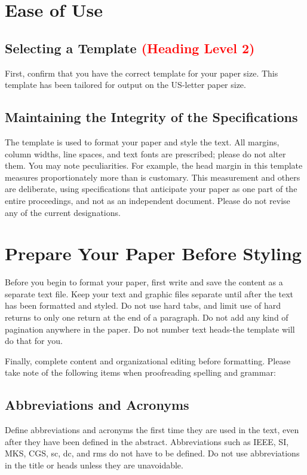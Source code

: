 \documentclass[conference]{IEEEconf}
\begin{document}
\section{Ease of Use}

\subsection{Selecting a Template \textcolor{red}{(Heading Level 2)}}
First, confirm that you have the correct template for your paper size. This template has been tailored for output on the US-letter paper size.

\subsection{Maintaining the Integrity of the Specifications}
The template is used to format your paper and style the text. All margins, column widths, line spaces, and text fonts are prescribed; please do not alter them. You may note peculiarities. For example, the head margin in this template measures proportionately more than is customary. This measurement and others are deliberate, using specifications that anticipate your paper as one part of the entire proceedings, and not as an independent document. Please do not revise any of the current designations.

\section{Prepare Your Paper Before Styling}
Before you begin to format your paper, first write and save the content as a separate text file. Keep your text and graphic files separate until after the text has been formatted and styled. Do not use hard tabs, and limit use of hard returns to only one return at the end of a paragraph. Do not add any kind of pagination anywhere in the paper. Do not number text heads-the template will do that for you.

Finally, complete content and organizational editing before formatting. Please take note of the following items when proofreading spelling and grammar:

\subsection{Abbreviations and Acronyms}
Define abbreviations and acronyms the first time they are used in the text, even after they have been defined in the abstract. Abbreviations such as IEEE, SI, MKS, CGS, sc, dc, and rms do not have to be defined. Do not use abbreviations in the title or heads unless they are unavoidable.
\end{document}
